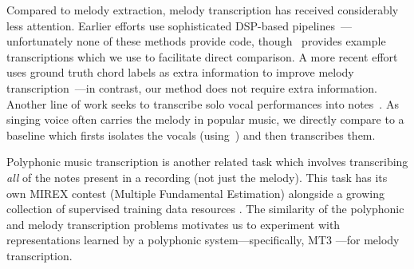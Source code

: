Compared to melody extraction, melody transcription has received considerably less attention. 
Earlier efforts use sophisticated DSP-based pipelines~\cite{paiva2004auditory,paiva2005detection,ryynanen2008automatic,weil2009automatic}---unfortunately none of these methods provide code, though~\cite{ryynanen2008automatic} provides example transcriptions which we use to facilitate direct comparison. 
A more recent effort uses ground truth chord labels as extra information to improve melody transcription~\cite{laaksonen2014automatic}---in contrast, our method does not require extra information. 
Another line of work seeks to transcribe solo vocal performances into notes~\cite{mauch2015computer,nishikimi2020bayesian,nishikimi2021audio}. 
As singing voice often carries the melody in popular music, we directly compare to a baseline which firsts isolates the vocals (using~\cite{hennequin2020spleeter}) and then transcribes them.

Polyphonic music transcription is another related task which involves transcribing \emph{all} of the notes present in a recording (not just the melody).
This task has its own MIREX contest (Multiple Fundamental \fnot{} Estimation) alongside a growing collection of supervised training data resources \cite{benetos2013automatic,thickstun2017learning,hawthorne2019enabling,manilow2019cutting}. 
The similarity of the polyphonic and melody transcription problems motivates us to
experiment with representations learned by a polyphonic system---specifically, MT3 \cite{gardner2021mt3}---for melody transcription.